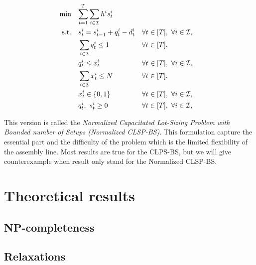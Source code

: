 \begin{subequations}\label{eq:Normalized-CLSP-BS}
  \begin{align}
    \min\quad & \rlap{$\ds \sum_{t=1}^{\horizon} \sum_{i\in\REF} \holding^i \inventory_t^i$}
    \label{eq:Normalized-CLSP-BS:objective}
    \\
    \st\quad & \ds \inventory_t^i = \inventory_{t-1}^i + \quantity_t^i - \demand_t^i && \forall t\in\range{\horizon},\ \forall i\in\REF,
    \label{eq:Normalized-CLSP-BS:stock-dynamics}
    \\
    & \ds \sum_{i\in\REF} \quantity_t^i \le 1 && \forall t\in\range{\horizon},
    \label{eq:Normalized-CLSP-BS:capacity}
    \\
    & \ds \quantity_t^i \le \setup_t^i && \forall t\in\range{\horizon},\ \forall i\in\REF,
    \label{eq:Normalized-CLSP-BS:item-capacity}
    \\
    & \ds \sum_{i\in\REF} \setup_t^i \le \nbsetups && \forall t\in\range{\horizon},
    \label{eq:Normalized-CLSP-BS:setups}
    \\
    & \ds \setup_t^i \in \crbracket{0,1} && \forall t\in\range{\horizon},\ \forall i\in\REF,
    \label{eq:Normalized-CLSP-BS:boolean}
    \\
    & \ds \quantity_t^i,\ \inventory_t^i \ge 0 && \forall t\in\range{\horizon},\ \forall i\in\REF,
    \label{eq:Normalized-CLSP-BS:positivity}
  \end{align}
\end{subequations}

This version is called the \emph{Normalized Capacitated Lot-Sizing Problem with Bounded number of Setups (Normalized CLSP-BS)}. This formulation capture the essential part and the difficulty of the problem which is the limited flexibility of the assembly line. Most results are true for the CLPS-BS, but we will give counterexample when result only stand for the Normalized CLSP-BS.


\section{Theoretical results}


\subsection{NP-completeness}


\subsection{Relaxations}

